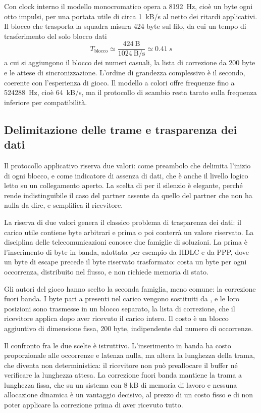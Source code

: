 \documentclass[11pt,a4paper]{article}
\begin{document}
Con clock interno il modello monocromatico opera a \SI{8192}{Hz}, cioè un byte ogni otto impulsi, per una portata utile di circa \SI{1}{kB/s} al netto dei ritardi applicativi. Il blocco che trasporta la squadra misura 424 byte sul filo, da cui un tempo di trasferimento del solo blocco dati
\begin{equation}
T_{\text{blocco}} \simeq \frac{424\ \text{B}}{1024\ \text{B/s}} \simeq \SI{0.41}{s}
\end{equation}
a cui si aggiungono il blocco dei numeri casuali, la lista di correzione da 200 byte e le attese di sincronizzazione. L'ordine di grandezza complessivo è il secondo, coerente con l'esperienza di gioco. Il modello a colori offre frequenze fino a \SI{524288}{Hz}, cioè \SI{64}{kB/s}, ma il protocollo di scambio resta tarato sulla frequenza inferiore per compatibilità.

\subsection{Delimitazione delle trame e trasparenza dei dati}

Il protocollo applicativo riserva due valori:  come preambolo che delimita l'inizio di ogni blocco, e  come indicatore di assenza di dati, che è anche il livello logico letto su un collegamento aperto. La scelta di  per il silenzio è elegante, perché rende indistinguibile il caso del partner assente da quello del partner che non ha nulla da dire, e semplifica il ricevitore.

La riserva di due valori genera il classico problema di trasparenza dei dati: il carico utile contiene byte arbitrari e prima o poi conterrà un valore riservato. La disciplina delle telecomunicazioni conosce due famiglie di soluzioni. La prima è l'inserimento di byte in banda, adottata per esempio da HDLC e da PPP, dove un byte di escape precede il byte riservato trasformato: costa un byte per ogni occorrenza, distribuito nel flusso, e non richiede memoria di stato.

Gli autori del gioco hanno scelto la seconda famiglia, meno comune: la correzione fuori banda. I byte pari a  presenti nel carico vengono sostituiti da , e le loro posizioni sono trasmesse in un blocco separato, la lista di correzione, che il ricevitore applica dopo aver ricevuto il carico intero. Il costo è un blocco aggiuntivo di dimensione fissa, 200 byte, indipendente dal numero di occorrenze.

Il confronto fra le due scelte è istruttivo. L'inserimento in banda ha costo proporzionale alle occorrenze e latenza nulla, ma altera la lunghezza della trama, che diventa non deterministica: il ricevitore non può preallocare il buffer né verificare la lunghezza attesa. La correzione fuori banda mantiene la trama a lunghezza fissa, che su un sistema con 8 kB di memoria di lavoro e nessuna allocazione dinamica è un vantaggio decisivo, al prezzo di un costo fisso e di non poter applicare la correzione prima di aver ricevuto tutto.
\end{document}
